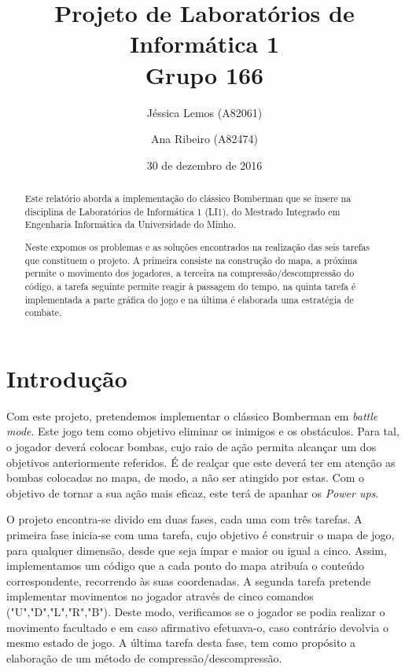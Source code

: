 \documentclass[a4paper]{article}
\title{Projeto de Laboratórios de Informática 1\\Grupo 166}
\author{Jéssica Lemos (A82061) \and Ana Ribeiro (A82474)}
\date{30 de dezembro de 2016}
\begin{document}
\maketitle
\thispagestyle{empty}
\cleardoublepage
{}
\begin{abstract}
Este relatório aborda a implementação do clássico Bomberman que se insere
na disciplina de Laboratórios de Informática 1 (LI1), do Mestrado Integrado em 
Engenharia Informática da Universidade do Minho.

Neste expomos os problemas e as soluções encontrados na realização das seis 
tarefas que constituem o projeto. A primeira consiste na construção
do mapa, a próxima permite o movimento dos jogadores, a terceira na 
compressão/descompressão do código, a tarefa seguinte permite reagir à passagem
do tempo, na quinta tarefa é implementada a parte gráfica do jogo e na última 
é elaborada uma estratégia de combate.   

 
\end{abstract}
\cleardoublepage

\thispagestyle{empty}
\tableofcontents
\cleardoublepage
{}
\setcounter {page}{1}

\section{Introdução}
\label{sec:intro}

Com este projeto, pretendemos implementar o clássico Bomberman em \textit{battle mode}.
Este jogo tem como objetivo eliminar os inimigos e os obstáculos. Para tal, o jogador 
deverá colocar bombas, cujo raio de ação permita alcançar um dos objetivos anteriormente 
referidos. É de realçar que este deverá ter em atenção as bombas colocadas no mapa, de modo, 
a não ser atingido por estas. Com o objetivo de tornar a sua ação mais eficaz, este terá de
apanhar os \textit{Power ups}.

O projeto encontra-se divido em duas fases, cada uma com três tarefas. A primeira fase inicia-se com uma tarefa, cujo objetivo é construir o mapa de jogo, para qualquer dimensão, desde que seja ímpar e maior ou igual a cinco. Assim, implementamos um código que a cada ponto do mapa atribuía o conteúdo correspondente, recorrendo às suas coordenadas. A segunda tarefa pretende implementar movimentos no jogador através de cinco comandos ("U","D","L","R","B"). Deste modo, verificamos se o jogador se podia realizar o movimento facultado e em caso afirmativo efetuava-o, caso contrário devolvia o mesmo estado de jogo. A última tarefa desta fase, tem como propósito a elaboração de um método de compressão/descompressão.
\end{document}

